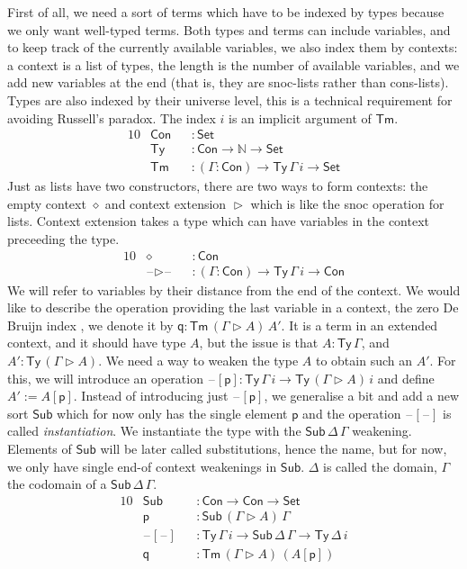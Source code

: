 \documentclass[sigplan,10pt,anonymous,review]{acmart}\settopmatter{printfolios=true,printccs=false,printacmref=false}
\newcommand{\ra}{\rightarrow}
\newcommand{\Set}{\mathsf{Set}}
\newcommand{\Ty}{\mathsf{Ty}}
\newcommand{\Tm}{\mathsf{Tm}}
\newcommand{\Con}{\mathsf{Con}}
\newcommand{\Sub}{\mathsf{Sub}}
\newcommand{\p}{\mathsf{p}}
\newcommand{\q}{\mathsf{q}}
\newcommand{\ext}{\mathop{\triangleright}}
\newcommand{\N}{\mathbb{N}}
\newcommand{\blank}{\mathord{\hspace{1pt}\text{--}\hspace{1pt}}} %
\begin{document}
First of all, we need a sort of terms which have to be indexed by
types because we only want well-typed terms. Both types and terms can
include variables, and to keep track of the currently available
variables, we also index them by contexts: a context is a list of
types, the length is the number of available variables, and we add new
variables at the end (that is, they are snoc-lists rather than
cons-lists). Types are also indexed by their universe level, this is a
technical requirement for avoiding Russell's paradox. The index $i$ is
an implicit argument of $\Tm$.
\begin{alignat*}{10}
& \Con && : \Set \\
& \Ty && : \Con\ra\N\ra\Set \\
& \Tm && : (\Gamma:\Con)\ra\Ty\,\Gamma\,i\ra\Set
\end{alignat*}
Just as lists have two constructors, there are two ways to form
contexts: the empty context $\diamond$ and context extension $\ext$
which is like the snoc operation for lists. Context extension takes a
type which can have variables in the context preceeding the type.
\begin{alignat*}{10}
& \diamond && : \Con \\
& \blank\ext\blank && : (\Gamma:\Con)\ra\Ty\,\Gamma\,i\ra\Con
\end{alignat*}
We will refer to variables by their distance from the end of the
context. We would like to describe the operation providing the last
variable in a context, the zero De Bruijn index \cite{debruijn}, we denote it by $\q :
\Tm\,(\Gamma\ext A)\,A'$. It is a term in an extended context, and it
should have type $A$, but the issue is that $A : \Ty\,\Gamma$, and $A'
: \Ty\,(\Gamma\ext A)$. We need a way to weaken the type $A$ to obtain
such an $A'$. For this, we will introduce an operation $\blank[\p] :
\Ty\,\Gamma\,i\ra\Ty\,(\Gamma\ext A)\,i$ and define $A' := A[\p]$. Instead
of introducing just $\blank[\p]$, we generalise a bit and add a new
sort $\Sub$ which for now only has the single element $\p$ and the
operation $\blank[\blank]$ is called \emph{instantiation}. We
instantiate the type with the $\Sub\,\Delta\,\Gamma$ weakening.
Elements of $\Sub$ will be later called
substitutions, hence the name, but for now, we only have single end-of
context weakenings in $\Sub$. $\Delta$ is called the domain, $\Gamma$
the codomain of a $\Sub\,\Delta\,\Gamma$.
\begin{alignat*}{10}
& \Sub && : \Con\ra\Con\ra\Set \\
& \p && : \Sub\,(\Gamma\ext A)\,\Gamma \\
& \blank[\blank] && : \Ty\,\Gamma\,i\ra\Sub\,\Delta\,\Gamma\ra\Ty\,\Delta\,i \\
& \q && : \Tm\,(\Gamma\ext A)\,(A[\p])
\end{alignat*}
\end{document}
